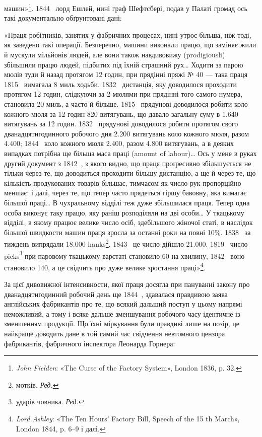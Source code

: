 \parcont{}  %
машин»\footnote{
\emph{John Fielden}: «The Curse of the Factory System», London
1836, p. 32.
}. 1844~ лорд Ешлей, нині граф Шефтсбері, подав
у Палаті громад ось такі документально обґрунтовані дані:

«Праця робітників, занятих у фабричних процесах, нині утроє
більша, ніж тоді, як заведено такі операції. Безперечно, машини
виконали працю, що заміняє жили й мускули мільйонів людей,
але вони також навдивовижу (prodigiousli) збільшили працю
людей, підбитих під їхній страшний рух\dots{} Ходити за парою
мюлів туди й назад протягом 12 годин, при прядінні пряжі
№ 40 — така праця 1815~ вимагала 8 миль ходьби. 1832~
дистанція, яку доводилося проходити протягом 12 годин, слідкуючи
за 2 мюлями при прядінні того самого нумера, становила
20 миль, а часто й більше. 1815~ прядунові доводилося робити
коло кожного мюля за 12 годин 820 витягувань, що давало загальну
суму в \num{1.640} витягувань за 12 годин. 1832~ прядунові
доводилося робити протягом свого дванадцятигодинного робочого
дня \num{2.200} витягувань коло кожного мюля, разом \num{4.400}; 1844~
коло кожного мюля \num{2.400}, разом \num{4.800} витягувань, а в деяких
випадках потрібна ще більша маса праці (amount of labour)\dots{}
Ось у мене в руках другий документ з 1842~, з якого видно,
що праця проґресивно збільшується не тільки через те, що доводиться
проходити більшу дистанцію, а ще й через те, що кількість
продукованих товарів більшає, тимчасом як число рук пропорційно
меншає: і далі, через те, що тепер часто прядеться гіршу
бавовну, яка вимагає більшої праці\dots{} В чухральному відділі
теж дуже збільшилася праця. Тепер одна особа виконує таку
працю, яку раніш розподіляли на дві особи\dots{} У ткацькому відділі,
в якому працює велике число осіб, здебільшого жіночої
статі, в наслідок більшої швидкости машин праця зросла за
останні роки на повні 10\%. 1838~ за тиждень випрядали \num{18.000}
hanks\footnote*{
мотків. \emph{Ред.}
}, 1843~ це число дійшло \num{21.000}. 1819~ число picks\footnote*{
ударів човника. \emph{Ред.}
}
при паровому ткацькому варстаті становило 60 на хвилину, 1842~
воно становило 140, а це свідчить про дуже велике зростання
праці»\footnote{
\emph{Lord Ashley}: «The Ten Hours’ Factory Bill, Speech of the 15 th
March», London 1844, p. 6--9 і далі.
}.

За цієї дивовижної інтенсивности, якої праця досягла при пануванні
закону про дванадцятигодинний робочий день ще 1844~,
здавалася правдивою заява англійських фабрикантів про те,
що всякий дальший поступ у цьому напрямі неможливий, а
тому і всяке дальше зменшування робочого часу ідентичне із
зменшенням продукції. Що їхні міркування були правдиві лише
на позір, це найкраще доводить дане в той самий час свідчення
невтомного цензора фабрикантів, фабричного інспектора Леонарда
Горнера:
